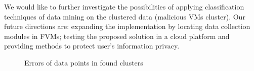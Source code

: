\documentclass[conference]{IEEEtran}
\begin{document}
We would like to further investigate the possibilities of applying classification techniques of data mining on the clustered data (malicious VMs cluster). Our future directions are: expanding the implementation by locating data collection modules in FVMs; testing the proposed solution in a cloud platform and providing methods to protect user's information privacy. 
\begin{figure}
\small
{}
\begin{center}
\caption{Errors of data points in found clusters}
\end{center}
\end{figure}
\balance



\end{document}
